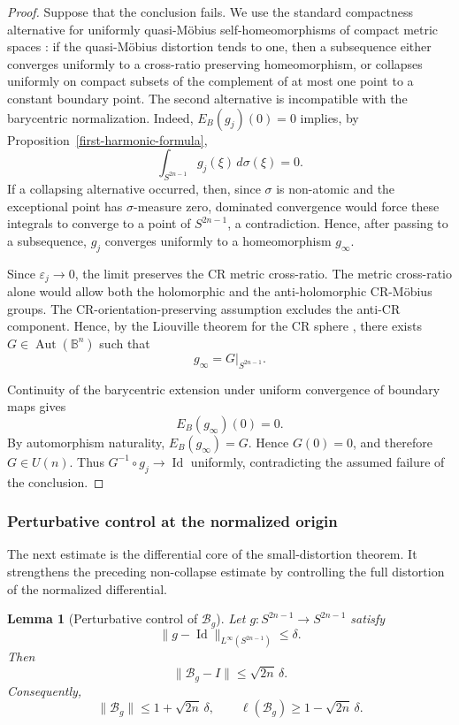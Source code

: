 \documentclass[11pt]{article}
\newtheorem{lemma}[theorem]{Lemma}
\theoremstyle{definition}
\theoremstyle{remark}
\theoremstyle{definition}
\newcommand{\B}{\mathbb B}
\newcommand{\Aut}{\operatorname{Aut}}
\newcommand{\Id}{\operatorname{Id}}
\begin{document}
\begin{proof}
Suppose that the conclusion fails.  We use the standard compactness alternative
for uniformly quasi-M\"obius self-homeomorphisms of compact metric spaces
\cite[Corollary~2.7]{Haissinsky}: if the quasi-M\"obius
distortion tends to one, then a subsequence either converges uniformly to a
cross-ratio preserving homeomorphism, or collapses uniformly on compact subsets
of the complement of at most one point to a constant boundary point.  The
second alternative is incompatible with the barycentric normalization.  Indeed,
\(E_B(g_j)(0)=0\) implies, by Proposition~\ref{first-harmonic-formula},
\[
        \int_{S^{2n-1}} g_j(\xi)\,d\sigma(\xi)=0.
\]
If a collapsing alternative occurred, then, since \(\sigma\) is non-atomic
and the exceptional point has \(\sigma\)-measure zero, dominated convergence
would force these integrals to converge to a point of \(S^{2n-1}\), a
contradiction.  Hence, after passing to a subsequence, \(g_j\) converges
uniformly to a homeomorphism \(g_\infty\).

Since \(\varepsilon_j\to0\), the limit preserves the CR metric cross-ratio.
The metric cross-ratio alone would allow both the holomorphic and the
anti-holomorphic CR-M\"obius groups.  The CR-orientation-preserving assumption
excludes the anti-CR component.  Hence, by the Liouville theorem for the CR
sphere \cite{Pansu,KoranyiReimann}, there exists \(G\in\Aut(\B^n)\) such that
\[
        g_\infty=G|_{S^{2n-1}}.
\]

Continuity of the barycentric extension under uniform convergence of boundary
maps gives
\[
        E_B(g_\infty)(0)=0.
\]
By automorphism naturality, \(E_B(g_\infty)=G\). Hence \(G(0)=0\), and
therefore \(G\in U(n)\). Thus \(G^{-1}\circ g_j\to\Id\) uniformly,
contradicting the assumed failure of the conclusion.
\end{proof}


\subsubsection{Perturbative control at the normalized origin}
\label{section-perturbative-distortion}

The next estimate is the differential core of the small-distortion theorem.  It
strengthens the preceding non-collapse estimate by controlling the full
distortion of the normalized differential.

\begin{lemma}[Perturbative control of \(\mathcal B_g\)]\label{lemma-perturbative-Bg}
Let \(g:S^{2n-1}\to S^{2n-1}\) satisfy
\[
        \|g-\Id\|_{L^\infty(S^{2n-1})}\le\delta.
\]
Then
\[
        \|\mathcal B_g-I\|\le \sqrt{2n}\,\delta.
\]
Consequently,
\[
        \|\mathcal B_g\|\le1+\sqrt{2n}\,\delta,
        \qquad
        \ell(\mathcal B_g)\ge1-\sqrt{2n}\,\delta.
\]
\end{lemma}
\end{document}

